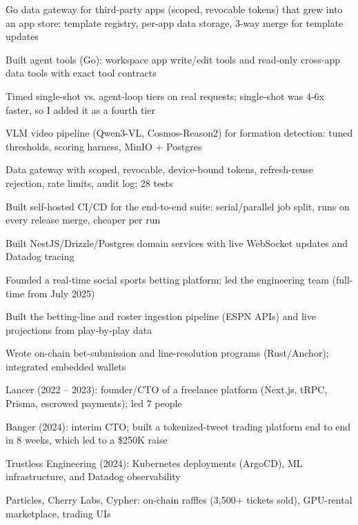\documentclass[print]{jack-resume}
\begin{document}
\begin{tightemize}
    \item Go data gateway for third-party apps (scoped, revocable tokens) that grew into an app store: template registry, per-app data storage, 3-way merge for template updates
    \item Built agent tools (Go): workspace app write/edit tools and read-only cross-app data tools with exact tool contracts
    \item Timed single-shot vs. agent-loop tiers on real requests; single-shot was 4-6x faster, so I added it as a fourth tier
    \item VLM video pipeline (Qwen3-VL, Cosmos-Reason2) for formation detection: tuned thresholds, scoring harness, MinIO + Postgres
    \item Data gateway with scoped, revocable, device-bound tokens, refresh-reuse rejection, rate limits, audit log; 28 tests
    \item Built self-hosted CI/CD for the end-to-end suite: serial/parallel job split, runs on every release merge, cheaper per run
\end{tightemize}
\sectionsep

\begin{tightemize}
    \item Built NestJS/Drizzle/Postgres domain services with live WebSocket updates and Datadog tracing
    \item Founded a real-time social sports betting platform; led the engineering team (full-time from July 2025)
    \item Built the betting-line and roster ingestion pipeline (ESPN APIs) and live projections from play-by-play data
    \item Wrote on-chain bet-submission and line-resolution programs (Rust/Anchor); integrated embedded wallets
\end{tightemize}
\sectionsep

\begin{tightemize}
    \item Lancer (2022 – 2023): founder/CTO of a freelance platform (Next.js, tRPC, Prisma, escrowed payments); led 7 people
    \item Banger (2024): interim CTO; built a tokenized-tweet trading platform end to end in 8 weeks, which led to a \$250K raise
    \item Trustless Engineering (2024): Kubernetes deployments (ArgoCD), ML infrastructure, and Datadog observability
    \item Particles, Cherry Labs, Cypher: on-chain raffles (3,500+ tickets sold), GPU-rental marketplace, trading UIs
\end{tightemize}
\sectionsep
\end{document}
